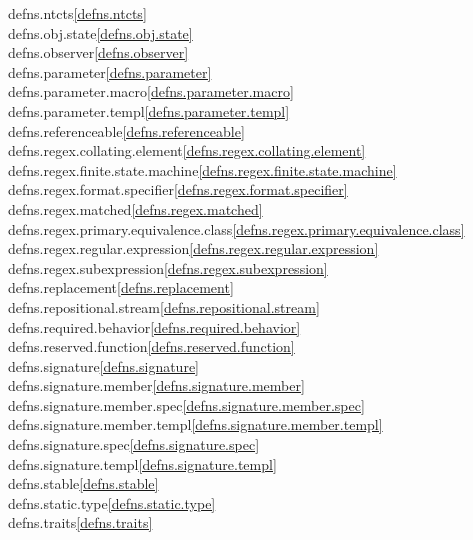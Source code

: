 \begin{multicols}{2}
defns.ntcts\quad\ref{defns.ntcts}\\
defns.obj.state\quad\ref{defns.obj.state}\\
defns.observer\quad\ref{defns.observer}\\
defns.parameter\quad\ref{defns.parameter}\\
defns.parameter.macro\quad\ref{defns.parameter.macro}\\
defns.parameter.templ\quad\ref{defns.parameter.templ}\\
defns.referenceable\quad\ref{defns.referenceable}\\
defns.regex.collating.element\quad\ref{defns.regex.collating.element}\\
defns.regex.finite.state.machine\quad\ref{defns.regex.finite.state.machine}\\
defns.regex.format.specifier\quad\ref{defns.regex.format.specifier}\\
defns.regex.matched\quad\ref{defns.regex.matched}\\
defns.regex.primary.equivalence.class\quad\ref{defns.regex.primary.equivalence.class}\\
defns.regex.regular.expression\quad\ref{defns.regex.regular.expression}\\
defns.regex.subexpression\quad\ref{defns.regex.subexpression}\\
defns.replacement\quad\ref{defns.replacement}\\
defns.repositional.stream\quad\ref{defns.repositional.stream}\\
defns.required.behavior\quad\ref{defns.required.behavior}\\
defns.reserved.function\quad\ref{defns.reserved.function}\\
defns.signature\quad\ref{defns.signature}\\
defns.signature.member\quad\ref{defns.signature.member}\\
defns.signature.member.spec\quad\ref{defns.signature.member.spec}\\
defns.signature.member.templ\quad\ref{defns.signature.member.templ}\\
defns.signature.spec\quad\ref{defns.signature.spec}\\
defns.signature.templ\quad\ref{defns.signature.templ}\\
defns.stable\quad\ref{defns.stable}\\
defns.static.type\quad\ref{defns.static.type}\\
defns.traits\quad\ref{defns.traits}\\

\end{multicols}
